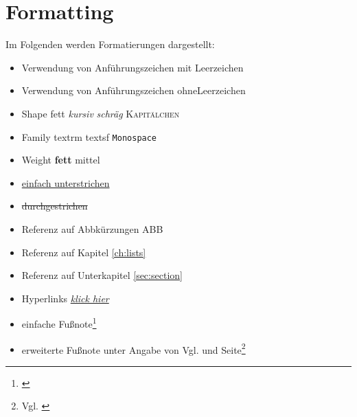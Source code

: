 \chapter{Formatting}
\label{ch:formatting}

Im Folgenden werden Formatierungen dargestellt:

\begin{itemize}
	\item{Verwendung von Anführungszeichen \glqq{}mit\grqq{} Leerzeichen}
	\item{Verwendung von Anführungszeichen \glqq ohne\grqq Leerzeichen}
	\item{Shape \textup{fett} \textit{kursiv} \textsl{schräg} \textsc{Kapitälchen}}
	\item{Family \textrm{textrm} \textsf{textsf}  \texttt{Monospace}}
	\item{Weight \textbf{fett} \textmd{mittel}}
	\item{\uline{einfach unterstrichen} }
	\item{ \sout{durchgestrichen} }
	\item{Referenz auf Abbkürzungen \ac{ABB}}
	\item{Referenz auf Kapitel \ref{ch:lists}}
	\item{Referenz auf Unterkapitel \ref{sec:section}}
	\item{Hyperlinks \href{https://google.com}{\textit{klick hier}}}
	\item{einfache Fußnote\footnote{\cite{Linz.2013}}}
	\item{erweiterte Fußnote unter Angabe von \glqq{}Vgl.\grqq{} und Seite\footnote{Vgl. \cite[S. 11f]{Linz.2013}}}
\end{itemize}